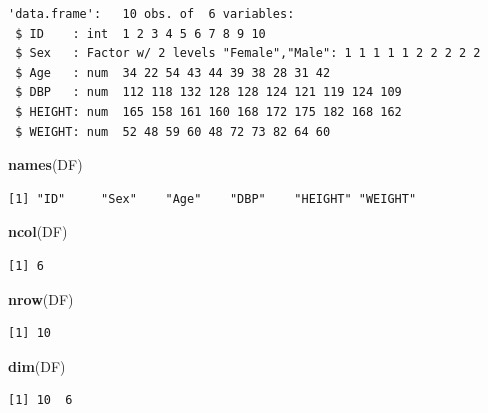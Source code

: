 \documentclass[11pt,a4paper]{book}
\newenvironment{Shaded}{\begin{snugshade}}{\end{snugshade}}
\newcommand{\KeywordTok}[1]{\textcolor[rgb]{0.13,0.29,0.53}{\textbf{#1}}}
\newcommand{\CommentTok}[1]{\textcolor[rgb]{0.56,0.35,0.01}{\textit{#1}}}
\newcommand{\OperatorTok}[1]{\textcolor[rgb]{0.81,0.36,0.00}{\textbf{#1}}}
\newcommand{\NormalTok}[1]{#1}
\theoremstyle{definition}
\theoremstyle{definition}
\theoremstyle{definition}
\theoremstyle{remark}
\begin{document}
\begin{verbatim}
'data.frame':   10 obs. of  6 variables:
 $ ID    : int  1 2 3 4 5 6 7 8 9 10
 $ Sex   : Factor w/ 2 levels "Female","Male": 1 1 1 1 1 2 2 2 2 2
 $ Age   : num  34 22 54 43 44 39 38 28 31 42
 $ DBP   : num  112 118 132 128 128 124 121 119 124 109
 $ HEIGHT: num  165 158 161 160 168 172 175 182 168 162
 $ WEIGHT: num  52 48 59 60 48 72 73 82 64 60
\end{verbatim}

\begin{Shaded}
\begin{Highlighting}[]
\KeywordTok{names}\NormalTok{(DF)}
\end{Highlighting}
\end{Shaded}

\begin{verbatim}
[1] "ID"     "Sex"    "Age"    "DBP"    "HEIGHT" "WEIGHT"
\end{verbatim}

\begin{Shaded}
\begin{Highlighting}[]
\KeywordTok{ncol}\NormalTok{(DF)}
\end{Highlighting}
\end{Shaded}

\begin{verbatim}
[1] 6
\end{verbatim}

\begin{Shaded}
\begin{Highlighting}[]
\KeywordTok{nrow}\NormalTok{(DF)}
\end{Highlighting}
\end{Shaded}

\begin{verbatim}
[1] 10
\end{verbatim}

\begin{Shaded}
\begin{Highlighting}[]
\KeywordTok{dim}\NormalTok{(DF)}
\end{Highlighting}
\end{Shaded}

\begin{verbatim}
[1] 10  6
\end{verbatim}

\begin{Shaded}
\end{Shaded}
\end{document}
